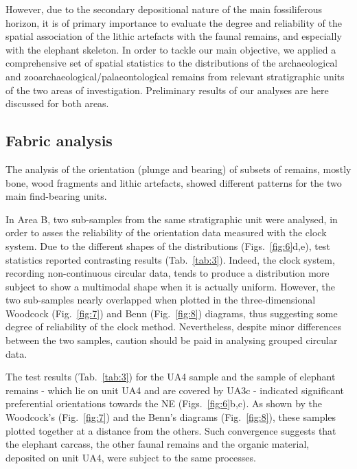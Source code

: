 \documentclass[preprint,authoryear,times]{elsarticle} %
\begin{document}
However, due to the secondary depositional nature of the main fossiliferous horizon, it is of primary importance to evaluate the degree and reliability of the spatial association of the lithic artefacts with the faunal remains, and especially with the elephant skeleton. In order to tackle our main objective, we applied a comprehensive set of spatial statistics to the distributions of the archaeological and zooarchaeological/palaeontological remains from relevant stratigraphic units of the two areas of investigation. Preliminary results of our analyses are here discussed for both areas.

\subsection{Fabric analysis}

The analysis of the orientation (plunge and bearing) of subsets of remains, mostly bone, wood fragments and lithic artefacts, showed different patterns for the two main find-bearing units.


In Area B, two sub-samples from the same stratigraphic unit were analysed, in order to asses the reliability of the orientation data measured with the clock system. Due to the different shapes of the distributions (Figs.~\ref{fig:6}d,e), test statistics reported contrasting results (Tab.~\ref{tab:3}). Indeed, the clock system, recording non-continuous circular data, tends to produce a distribution more subject to show a multimodal shape when it is actually uniform. However, the two sub-samples nearly overlapped when plotted in the three-dimensional Woodcock (Fig.~\ref{fig:7}) and Benn (Fig.~\ref{fig:8}) diagrams, thus suggesting some degree of reliability of the clock method. Nevertheless, despite minor differences between the two samples, caution should be paid in analysing grouped circular data.


The test results (Tab.~\ref{tab:3}) for the UA4 sample and the sample of elephant remains - which lie on unit UA4 and are covered by UA3c - indicated significant preferential orientations towards the NE (Figs.~\ref{fig:6}b,c). As shown by the Woodcock's (Fig.~\ref{fig:7}) and the Benn's diagrams (Fig.~\ref{fig:8}), these samples plotted together at a distance from the others. Such convergence suggests that the elephant carcass, the other faunal remains and the organic material, deposited on unit UA4, were subject to the same processes.
\end{document}
